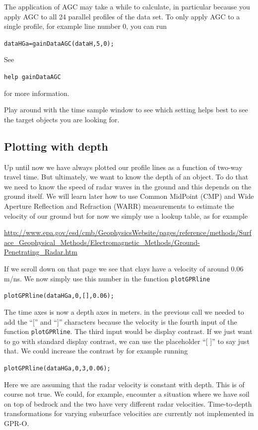 \documentclass[11pt]{article}
\begin{document}
The application of AGC may take a while to calculate, in particular
because you apply AGC to all 24 parallel profiles of the data set. To
only apply AGC to a single profile, for example line number 0, you can
run

\qquad \verb#dataHGa=gainDataAGC(dataH,5,0);#

See

\qquad \verb#help gainDataAGC#

for more information.


Play around with the time sample window to see which setting helps
best to see the target objects you are looking for.


\subsection{Plotting with depth}

Up until now we have always plotted our profile lines as a function of
two-way travel time. But ultimately, we want to know the depth of an
object. To do that we need to know the speed of radar waves in the
ground and this depends on the ground itself. We will learn later how
to use Common MidPoint (CMP) and Wide Aperture Reflection and
Refraction (WARR) measurements to estimate the velocity of our ground
but for now we simply use a lookup table, as for example
  
\url{http://www.epa.gov/esd/cmb/GeophysicsWebsite/pages/reference/methods/Surface_Geophysical_Methods/Electromagnetic_Methods/Ground-Penetrating_Radar.htm}
  
If we scroll down on that page we see that clays have a velocity of
around 0.06 m/ns. We now simply use this number in the function
\verb#plotGPRline#
  
\qquad \verb#plotGPRline(dataHGa,0,[],0.06);#
  
The time axes is now a depth axes in meters. in the previous call we
needed to add the ``['' and ``]'' characters because the velocity is
the fourth input of the function \verb#plotGPRline#. The third input
would be display contrast. If we just want to go with standard display
contrast, we can use the placeholder ``[ ]'' to say just that. We
could increase the contrast by for example running
  
\qquad \verb#plotGPRline(dataHGa,0,3,0.06);#

Here we are assuming that the radar velocity is constant with
depth. This is of course not true. We could, for example, encounter a
situation where we have soil on top of bedrock and the two have very
different radar velocities. Time-to-depth transformations for varying
subsurface velocities are currently not implemented in GPR-O.
\end{document}
